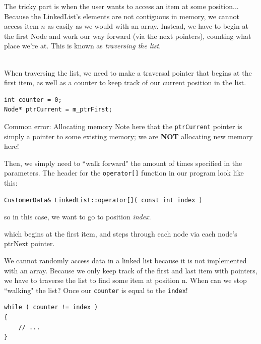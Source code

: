 \documentclass[a4paper,12pt,oneside]{book}
\begin{document}
        The tricky part is when the user wants to access an item at some
        position... Because the LinkedList's elements are not contiguous
        in memory, we cannot access item $n$ as easily as we would with
        an array. Instead, we have to begin at the first Node and
        work our way forward (via the next pointers), counting what place
        we're at. This is known as \textit{traversing the list}.
    
        ~\\
        When traversing the list, we need to make a traversal pointer
        that begins at the first item, as well as a counter to keep
        track of our current position in the list.
        
\begin{lstlisting}[style=code]
int counter = 0;
Node* ptrCurrent = m_ptrFirst;
\end{lstlisting}

        \begin{error}{Common error: Allocating memory}
            Note here that the \texttt{ptrCurrent} pointer is simply
            a pointer to some existing memory; we are \textbf{NOT}
            allocating new memory here!
        \end{error}

        Then, we simply need to ``walk forward" the amount of times
        specified in the parameters. The header for the \texttt{operator[]}
        function in our program look like this:
        
\begin{verbatim}
CustomerData& LinkedList::operator[]( const int index )
\end{verbatim}
        
        so in this case, we want to go to position \textit{index}.
        
        
        which begins at the first item, and steps through each node via 
        each node's ptrNext pointer.

        We cannot randomly access data in a linked list because it is not 
        implemented with an array. Because we only keep track of the first 
        and last item with pointers, we have to traverse the list to find some 
        item at position n. When can we stop ``walking" the list? Once
        our \texttt{counter} is equal to the \texttt{index}!

\begin{lstlisting}[style=code]
while ( counter != index )
{
    // ...
}
\end{lstlisting}    
    
\end{document}
